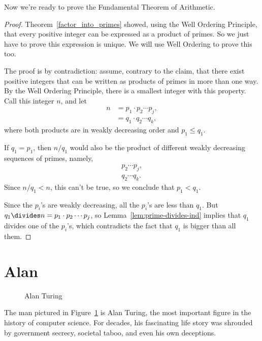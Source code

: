 Now we're ready to prove the Fundamental Theorem of Arithmetic.
\begin{proof}
Theorem~\ref{factor_into_primes} showed, using the Well Ordering
Principle, that every positive integer can be expressed as a product
of primes.  So we just have to prove this expression is unique.  We
will use Well Ordering to prove this too.

The proof is by contradiction: assume, contrary to the claim, that
there exist positive integers that can be written as products of
primes in more than one way.  By the Well Ordering Principle, there is
a smallest integer with this property.  Call this integer $n$, and let
\begin{align*}
n & = p_1 \cdot p_2 \cdots p_j, \\ & = q_1 \cdot q_2 \cdots q_k,
\end{align*}
where both products are in weakly decreasing order and $p_1 \le q_1$.

If $q_1 = p_1$, then $n/q_1$ would also be the product of different
weakly decreasing sequences of primes, namely,
\begin{align*}
 p_2 \cdots p_j, \\ q_2 \cdots q_k.
\end{align*}
Since $n/q_1 < n$, this can't be true, so we conclude that $p_1 <
q_1$.

Since the $p_i$'s are weakly decreasing, all the $p_i$'s are less than
$q_1$.  But $q_1 \divides n= p_1 \cdot p_2 \cdots p_j$, so
Lemma~\ref{lem:prime-divides-ind} implies that $q_1$ divides one of
the $p_i$'s, which contradicts the fact that $q_1$ is bigger than all
them.
\end{proof}

\begin{problems}
\classproblems {}

\homeworkproblems {}

\end{problems}

\section{Alan }\label{Turing_sec}

\begin{figure}\redrawntrue
{}
\caption{Alan Turing}
\label{fig:Turing}
\end{figure}

The man pictured in Figure~\ref{fig:Turing} is Alan Turing, the most
important figure in the history of computer science.  For decades, his
fascinating life story was shrouded by government secrecy, societal
taboo, and even his own deceptions.

